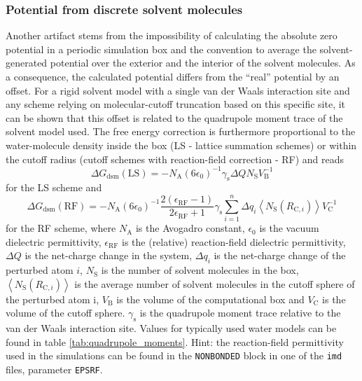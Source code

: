 \subsubsection{Potential from discrete solvent molecules}
Another artifact stems from the impossibility of calculating the
absolute zero potential in a periodic simulation box and the
convention to average the solvent-generated potential over the
exterior and the interior of the solvent molecules. As a consequence,
the calculated potential differs from the ``real'' potential by an
offset. For a rigid solvent model with a single van der Waals
interaction site and any scheme relying on molecular-cutoff truncation
based on this specific site, it can be shown that this offset is
related to the quadrupole moment trace of the solvent model used. The
free energy correction is furthermore proportional to the
water-molecule density inside the box (LS - lattice summation schemes)
or within the cutoff radius (cutoff schemes with reaction-field
correction - RF) and reads
\begin{equation}
  \Delta G_{\text{dsm}}(\text{LS}) = -N_{\text{A}} (6 \epsilon_0)^{-1} \gamma_{\text{s}} \Delta Q N_{\text{S}} V_{\text{B}}^{-1}
\end{equation}
for the LS scheme and
\begin{equation} \label{equ:dsm}
  \Delta G_{\text{dsm}}(\text{RF}) = -N_{\text{A}} (6 \epsilon_0)^{-1} \frac{2 (\epsilon_{\text{RF}}-1)}{2\epsilon_{\text{RF}}+1} \gamma_{\text{s}} \sum_{i=1}^n \Delta q_i \left\langle N_{\text{S}}(R_{\text{C},i})\right\rangle V_{\text{C}}^{-1}
\end{equation}
for the RF scheme, where $N_{\text{A}}$ is the Avogadro constant, $\epsilon_0$
is the vacuum dielectric permittivity, $\epsilon_{\text{RF}}$ is the (relative)
reaction-field dielectric permittivity, $\Delta Q$ is the net-charge
change in the system, $\Delta q_i$ is the net-charge change of the perturbed atom $i$, $N_{\text{S}}$ is the number of solvent molecules in the
box, $\left\langle N_{\text{S}}(R_{\text{C},i})\right\rangle$ is the average number of
solvent molecules in the cutoff sphere of the perturbed atom i, $V_{\text{B}}$ is the volume of the
computational box and $V_{\text{C}}$ is the volume of the cutoff
sphere. $\gamma_{\text{s}}$ is the quadrupole moment trace relative to the van
der Waals interaction site. Values for typically used water models can be found in
table \ref{tab:quadrupole_moments}. Hint: the reaction-field permittivity used in the simulations can be found in the \texttt{NONBONDED} block in one of the \texttt{imd} files, parameter \texttt{EPSRF}.

